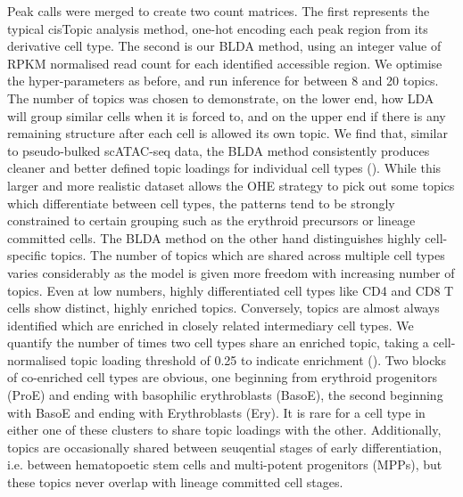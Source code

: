 Peak calls were merged to create two count matrices. The first represents the typical cisTopic analysis method, one-hot encoding each peak region from its derivative cell type. The second is our BLDA method, using an integer value of RPKM normalised read count for each identified accessible region. We optimise the hyper-parameters as before, and run inference for between 8 and 20 topics. The number of topics was chosen to demonstrate, on the lower end, how LDA will group similar cells when it is forced to, and on the upper end if there is any remaining structure after each cell is allowed its own topic. We find that, similar to pseudo-bulked scATAC-seq data, the BLDA method consistently produces cleaner and better defined topic loadings for individual cell types (). While this larger and more realistic dataset allows the OHE strategy to pick out some topics which differentiate between cell types, the patterns tend to be strongly constrained to certain grouping such as the erythroid precursors or lineage committed cells. The BLDA method on the other hand distinguishes highly cell-specific topics. The number of topics which are shared across multiple cell types varies considerably as the model is given more freedom with increasing number of topics. Even at low numbers, highly differentiated cell types like CD4 and CD8 T cells show distinct, highly enriched topics. Conversely, topics are almost always identified which are enriched in closely related intermediary cell types. We quantify the number of times two cell types share an enriched topic, taking a cell-normalised topic loading threshold of 0.25 to indicate enrichment (). Two blocks of co-enriched cell types are obvious, one beginning from erythroid progenitors (ProE) and ending with basophilic erythroblasts (BasoE), the second beginning with BasoE and ending with Erythroblasts (Ery). It is rare for a cell type in either one of these clusters to share topic loadings with the other. Additionally, topics are occasionally shared between seuqential stages of early differentiation, i.e. between hematopoetic stem cells and multi-potent progenitors (MPPs), but these topics never overlap with lineage committed cell stages.  



